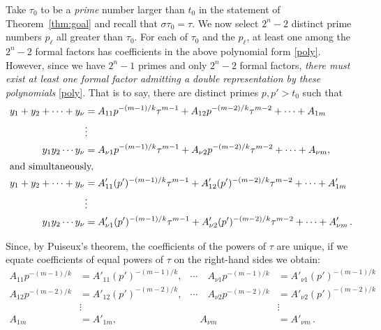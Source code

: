 \documentclass{article}
\theoremstyle{plain}
\theoremstyle{definition}
\begin{document}
Take $\tau_0$ to be a \emph{prime} number larger than $t_0$ in the statement of 
Theorem~\ref{thm:goal} and recall that $\sigma\tau_0 = \tau.$
We now select $2^n - 2$ distinct prime numbers $p_{\ell}$ all greater than $\tau_0$.
For each of $\tau_0$ and the $p_{\ell}$, at least one among the $2^n - 2$
formal factors has coefficients in the above polynomial form
\eqref{poly}. However, since we have $2^n - 1$ primes and
only $2^n - 2$ formal factors, \emph{there must
exist at least one formal factor admitting a double representation by
these polynomials} \eqref{poly}. That is to say, there are distinct primes $p,p' > t_0$ such that
\begin{align*}
y_1 + y_2 +\cdots+ y_\nu
&= A_{11} p^{-(m-1)/k} \tau^{m-1} 
+ A_{12}p^{-(m-2)/k} \tau^{m-2} +\cdots+ A_{1m}
\\   
 & \vdots
\\
y_1 y_2 \cdots y_{\nu}
&= A_{\nu1} p^{-(m-1)/k} \tau^{m-1} 
+ A_{\nu2} p^{-(m-2)/k} \tau^{m-2} +\cdots+ A_{\nu m},
\\
\intertext{and simultaneously,}
y_1 + y_2 +\cdots+ y_\nu
&= A'_{11} (p')^{-(m-1)/k} \tau^{m-1}
+ A'_{12} (p')^{-(m-2)/k} \tau^{m-2} +\cdots+ A'_{1m}
\\   
 & \vdots
\\
y_1 y_2 \cdots y_\nu
&= A'_{\nu1} (p')^{-(m-1)/k} \tau^{m-1}
+ A'_{\nu2} (p')^{-(m-2)/k} \tau^{m-2} +\cdots+ A'_{\nu m} \,.
\end{align*}    

\noindent 
Since, by Puiseux's theorem, the coefficients of the powers of $\tau$ are unique, if we equate coefficients of equal powers of $\tau$ on the right-hand sides we obtain:
\[
\begin{aligned}
A_{11}p^{-(m-1)/k}  
&= A'_{11} (p')^{-(m-1)/k}, & \cdots \quad A_{\nu 1} p^{-(m-1)/k} &= A'_{\nu 1} (p')^{-(m-1)/k} 
\\
A_{12}p^{-(m-2)/k}  
&= A'_{12} (p')^{-(m-2)/k}, & \cdots \quad A_{\nu 2} p^{-(m-2)/k} &= A'_{\nu 2} (p')^{-(m-2)/k} 
\\
 &\vdots  &  &\vdots\quad \quad & \quad
\\
A_{1m} &= A'_{1m}, &  \quad A_{\nu m} &= A'_{\nu m} \, .
\end{aligned}
\]

\end{document}

